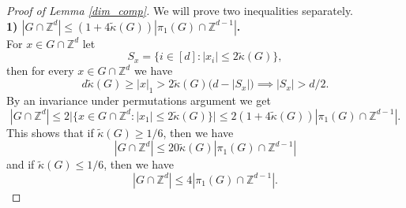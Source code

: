 \documentclass[a4paper,oneside, reqno]{amsart}
\numberwithin{equation}{section}
\theoremstyle{definition}%
\theoremstyle{definition}
\theoremstyle{definition}%
\theoremstyle{definition}
\newcommand{\Z}{\mathbb{Z}}
\begin{document}
\begin{proof}[Proof of Lemma \ref{dim_comp}]
We will prove two inequalities separately.
\\
\textbf{1) $ |G \cap \Z^d| \le (1+4 \widetilde{\kappa}(G)) | \pi_1(G) \cap \Z^{d-1} |$.} \\
For $x \in G \cap \Z^d$ let 
\[
S_x=\Big\{ i \in [d]: |x_i| \le 2\widetilde{\kappa}(G) \Big\}, 
\]
then for every $x \in G \cap \Z^d$ we have
\[
d \widetilde{\kappa}(G) \ge |x|_1 > 2 \widetilde{\kappa}(G) \big(d-|S_x|\big) \implies |S_x| >d/2.
\]
By an invariance under permutations argument we get
\[
|G \cap \Z^d| \le 2 \big|\big\{ x \in G \cap \Z^d : |x_1| \le 2 \widetilde{\kappa}(G)\big\} \big| \le 2(1+4 \widetilde{\kappa}(G)) |\pi_1(G) \cap \Z^{d-1}|.
\]
This shows that if $\widetilde{\kappa}(G) \ge 1/6$, then we have 
\[
|G \cap \Z^d| \le 20\widetilde{\kappa}(G) | \pi_1(G) \cap \Z^{d-1} |
\]
and if $\widetilde{\kappa}(G) \le 1/6$, then we have
\[
|G \cap \Z^d| \le 4 | \pi_1(G) \cap \Z^{d-1} |.
\]


\end{proof}
\end{document}
